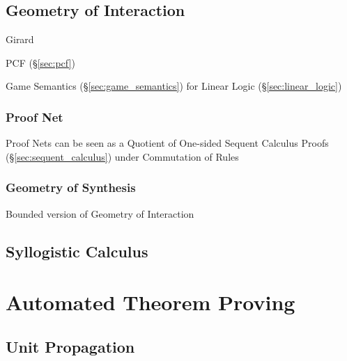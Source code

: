 \subsection{Geometry of Interaction}
\label{sec:geometry_of_interaction}

Girard

PCF (\S\ref{sec:pcf})

Game Semantics (\S\ref{sec:game_semantics}) for Linear Logic
(\S\ref{sec:linear_logic})



\subsubsection{Proof Net} \label{sec:proof_net}

\cite{llwiki16}

Proof Nets can be seen as a Quotient of One-sided Sequent Calculus
Proofs (\S\ref{sec:sequent_calculus}) under Commutation of Rules



\subsubsection{Geometry of Synthesis} \label{sec:geometry_of_synthesis}

Bounded version of Geometry of Interaction



\subsection{Syllogistic Calculus} \label{sec:syllogistic_calculus}



\section{Automated Theorem Proving}\label{sec:atp}

\subsection{Unit Propagation}\label{sec:unit_propagation}

